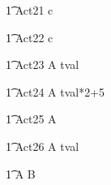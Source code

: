 \begin{circusaction}
	\t1 Act21 \circdef c \then  \Skip \circendby {} \rcirctime \\
\end{circusaction}


\begin{circusaction}
	\t1 Act22 \circdef c \then  \Stop  \circendby  {} \rcirctime  \\
\end{circusaction}


\begin{circusaction}
	\t1 Act23 \circdef  A \circendby \lcirctime tval \rcirctime\\
\end{circusaction}

\begin{circusaction}
	\t1 Act24 \circdef  A \circendby \lcirctime tval*2+5 \rcirctime\\
\end{circusaction}
 


\begin{circusaction}
    	\t1 Act25 \circdef  A \circendby {}  \rcirctime \\
\end{circusaction}

\begin{circusaction}
    	\t1 Act26 \circdef  A \circendby {} \upto tval \rcirctime \\
\end{circusaction}



\begin{circusaction}        
        \t1 \circspot A \circseq B\\
\end{circusaction}

\begin{circus}    
\circend
\end{circus}
